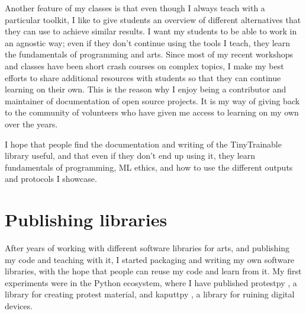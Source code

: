 Another feature of my classes is that even though I always teach with a particular toolkit, I like to give students an overview of different alternatives that they can use to achieve similar results. I want my students to be able to work in an agnostic way; even if they don't continue using the tools I teach, they learn the fundamentals of programming and arts. Since most of my recent workshops and classes have been short crash courses on complex topics, I make my best efforts to share additional resources with students so that they can continue learning on their own. This is the reason why I enjoy being a contributor and maintainer of documentation of open source projects. It is my way of giving back to the community of volunteers who have given me access to learning on my own over the years.

I hope that people find the documentation and writing of the TinyTrainable library useful, and that even if they don't end up using it, they learn fundamentals of programming, \acrshort{ML} ethics, and how to use the different outputs and protocols I showcase.

\section{Publishing libraries}

After years of working with different software libraries for arts, and publishing my code and teaching with it, I started packaging and writing my own software libraries, with the hope that people can reuse my code and learn from it. My first experiments were in the Python ecosystem, where I have published protestpy \cite{website-pypi-protestpy}, a library for creating protest material, and kaputtpy \cite{website-pypi-kaputtpy}, a library for ruining digital devices.

